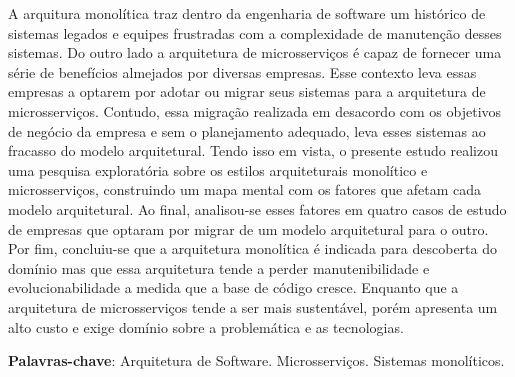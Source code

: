 \begin{resumo}
    A arquitura monolítica traz dentro da engenharia de software um histórico de sistemas legados e
    equipes frustradas com a complexidade de manutenção desses sistemas. Do outro lado a arquitetura
    de microsserviços é capaz de fornecer uma série de benefícios almejados por diversas empresas.
    Esse contexto leva essas empresas a optarem por adotar ou migrar seus sistemas para a
    arquitetura de microsserviços. Contudo, essa migração realizada em desacordo com os objetivos de
    negócio da empresa e sem o planejamento adequado, leva esses sistemas ao fracasso do modelo
    arquitetural. Tendo isso em vista, o presente estudo realizou uma pesquisa exploratória sobre os
    estilos arquiteturais monolítico e microsserviços, construindo um mapa mental com os fatores que
    afetam cada modelo arquitetural. Ao final, analisou-se esses fatores em quatro casos de estudo de
    empresas que optaram por migrar de um modelo arquitetural para o outro. Por fim, concluiu-se que
    a arquitetura monolítica é indicada para descoberta do domínio mas que essa arquitetura tende a
    perder manutenibilidade e evolucionabilidade a medida que a base de código cresce. Enquanto que
    a arquitetura de microsserviços tende a ser mais sustentável, porém apresenta um alto custo e
    exige domínio sobre a problemática e as tecnologias.
 \vspace{\onelineskip}
    
 \noindent
  \textbf{Palavras-chave}: Arquitetura de Software. Microsserviços. Sistemas monolíticos.
\end{resumo}

